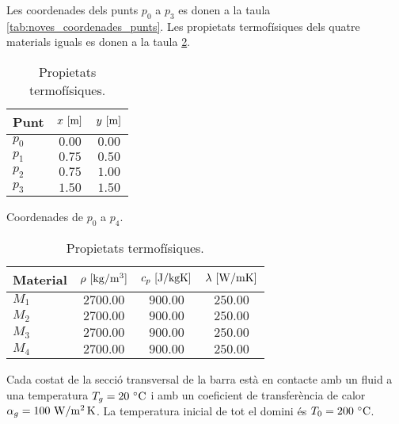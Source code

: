 \noindent
Les coordenades dels punts $p_0$ a $p_3$ es donen a la taula \ref{tab:noves_coordenades_punts}. Les propietats termofísiques dels quatre materials iguals es donen a la taula \ref{tab:noves_propietats_termofisiques}.
\begin{table}[h]
	\begin{minipage}[t]{.5\linewidth}
		\centering
		\begin{tabular}[t]{lcc}
			\toprule[0.5mm]
			Punt & $x \ [\meter]$ & $y \ [\meter]$ \\
			\midrule[0.25mm]
			$p_0$ & $0.00$ & $0.00$ \\			
			$p_1$ & $0.75$ & $0.50$ \\
			$p_2$ & $0.75$ & $1.00$ \\
			$p_3$ & $1.50$ & $1.50$ \\		
			\bottomrule[0.5mm]
		\end{tabular}
		\caption{Coordenades de $p_0$ a $p_4$.}
		\label{tab:noves_coordenades_punts}
	\end{minipage}%
	\begin{minipage}[t]{.5\linewidth}
		\centering
		\begin{tabular}[t]{lccc}
			\toprule[0.5mm]
			Material & $\rho \ [\kilo\gram / \meter^3]$ & $c_p \ [\joule / \kilo\gram \kelvin]$ & $\lambda \ [\watt / \meter \kelvin]$ \\
			\midrule[0.25mm]
			$M_1$ & $2700.00$ & $900.00$ & $250.00$ \\
			$M_2$ & $2700.00$ & $900.00$ & $250.00$ \\
			$M_3$ & $2700.00$ & $900.00$ & $250.00$ \\
			$M_4$ & $2700.00$ & $900.00$ & $250.00$ \\	
			\bottomrule[0.5mm]
		\end{tabular}
		\caption{Propietats termofísiques.}
		\label{tab:noves_propietats_termofisiques}
	\end{minipage} 
\end{table}

\noindent
Cada costat de la secció transversal de la barra està en contacte amb un fluid a una temperatura $T_g = 20 \ \celsius$ i amb un coeficient de transferència de calor $\alpha_g = 100 \ \watt / \meter^2 \, \kelvin$. La temperatura inicial de tot el domini és $T_0 = 200 \ \celsius$. 



